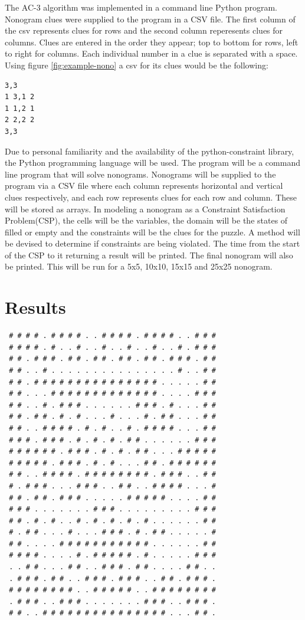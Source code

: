 \documentclass[12pt, letterpaper]
{article}
\begin{document}
The AC-3 algorithm was implemented in a command line Python program. Nonogram clues were supplied to the program in a CSV file. The first column of the csv represents clues for rows and the second column reperesents clues for columns. Clues are entered in the order they appear; top to bottom for rows, left to right for columns. Each individual number in a clue is separated with a space. Using figure \ref{fig:example-nono} a csv for its clues would be the following:
\begin{lstlisting}
3,3
1 3,1 2
1 1,2 1
2 2,2 2
3,3
\end{lstlisting}
Due to personal familiarity and the availability of the python-constraint \cite{pycon} library, the Python programming language will be used. The program will be a command line program that will solve nonograms. Nonograms will be supplied to the program via a CSV file where each column represents horizontal and vertical clues respectively, and each row represents clues for each row and column. These will be stored as arrays.
In modeling a nonogram as a Constraint Satisfaction Problem(CSP), the cells will be the variables, the domain will be the states of filled or empty and the constraints will be the clues for the puzzle. A method will be devised to determine if constraints are being violated. The time from the start of the CSP to it returning a result will be printed. The final nonogram will also be printed. This will be run for a 5x5, 10x10, 15x15 and 25x25 nonogram.

\section{Results}

\begin{lstlisting}
 # # # # . # # # # . . # # # # . # # # # . . # # #
 # # # # . # . . # . . # . . # . . # . . # . # # #
 # # . # # # . # # . # # . # # . # # . # # # . # #
 # # . . # . . . . . . . . . . . . . . . # . . # #
 # # . # # # # # # # # # # # # # # # . . . . . # #
 # # . . . # # # # # # # # # # # # # . . . . # # #
 # # . . # . # # # . . . . . . # # # . # . . . # #
 # # . # # . # . # . . . # . . . # . # # . . . # #
 # # . . # # # # . # . # . . # . # # # # . . . # #
 # # # . # # # . # . # . # . # # . . . . . . # # #
 # # # # # # . # # # . # . # . # # . . . # # # # #
 # # # # # . # # # . # . # . . . # # . # # # # # #
 # # . . # # # # . # # # # # # # # . # # # . . # #
 # . # # # . . . # # # . . # # . . # # # # . . . #
 # # . # # . # # # . . . . . # # # # # . . . . # #
 # # # . . . . . . . # # # . . . . . . . . . # # #
 # # . # . # . . # . # . # . # . # . . . . . . # #
 # . # # . . . # . . . # # # . # . # # . . . . . #
 # # . . . . # # # # # # # # # # # . . . . . . # #
 # # # # . . . . # . # # # # # . # . . . . . # # #
 . . # # . . . # # . . # # # . # # . . . . # # . .
 . # # # . # # . . # # # . # # # . . # # . # # # .
 # # # # # # # # . . # # # # # . . # # # # # # # #
 . # # # . . # # # . . . . . . . # # # . . # # # .
 # # . . # # # # # # # # # # # # # # # . . . # # .
\end{lstlisting}
\end{document}
